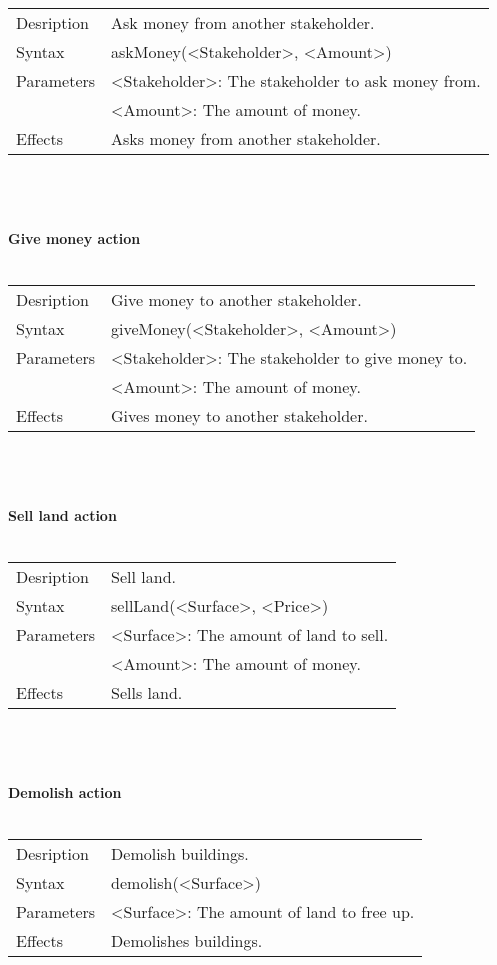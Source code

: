 \documentclass[english,11pt]{report}
\begin{document}
\\
\begin{tabularx}{\textwidth}{lX}
 Desription & Ask money from another stakeholder. \\
 Syntax & askMoney(<Stakeholder>, <Amount>) \\
 Parameters & <Stakeholder>: The stakeholder to ask money from.\\
            & <Amount>: The amount of money.\\
 Effects &  Asks money from another stakeholder.
\end{tabularx}\\
\\
\\
\textbf{Give money action}\\
\\
\begin{tabularx}{\textwidth}{lX}
 Desription & Give money to another stakeholder. \\
 Syntax & giveMoney(<Stakeholder>, <Amount>) \\
 Parameters & <Stakeholder>: The stakeholder to give money to.\\
            & <Amount>: The amount of money.\\
 Effects &  Gives money to another stakeholder.
\end{tabularx}\\
\\
\\
\textbf{Sell land action}\\
\\
\begin{tabularx}{\textwidth}{lX}
 Desription & Sell land. \\
 Syntax & sellLand(<Surface>, <Price>) \\
 Parameters & <Surface>: The amount of land to sell.\\
            & <Amount>: The amount of money.\\
 Effects &  Sells land.
\end{tabularx}\\
\\
\\
\textbf{Demolish action}\\
\\
\begin{tabularx}{\textwidth}{lX}
 Desription & Demolish buildings. \\
 Syntax & demolish(<Surface>) \\
 Parameters & <Surface>: The amount of land to free up.\\
 Effects &  Demolishes buildings.
\end{tabularx}
\end{document}
